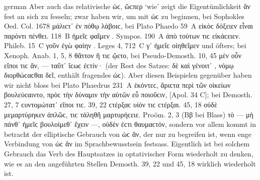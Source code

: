 \begin{otherlanguage*}{german}
Aber auch das relativische ὡϲ, ὥϲπερ ‘wie’ zeigt die Eigentümlichkeit ἄν fest an sich zu fesseln; zwar haben wir, um mit ὡϲ zu beginnen, bei Sophokles Oed. Col. 1678  μάλιϲτ᾽  ἐν πόθῳ λάβοιϲ, bei Plato Phaedo 59~A  εἰκὸϲ δόξειεν  εἶναι παρόντι πένθει. 118~Β  ἡμεῖϲ φαῖμεν . Sympos. 190~Α  ἀπὸ τούτων  τιϲ εἰκάϲειεν. Phileb. 15~C  γοῦν ἐγὼ φαίην . Leges 4, 712~C  γ᾽ ἡμεῖϲ  οἰηθεῖμεν und öfters; bei Xenoph. Anab. 1, 5, 8 θᾶττον ἢ  τιϲ  ᾤετο, bei Pseudo-Demosth. 10, 45  μὲν οὖν εἴποι τιϲ {ἄν}, — ταῦτ᾽ ἴϲωϲ ἐϲτίν· (der Rest des Satzes:  δὲ καὶ γένοιτ᾽ , νόμῳ διορθώϲαϲθαι δεῖ, enthält fragendes ὡϲ). Aber diesen Beispielen gegenüber haben wir nicht bloss bei Plato Phaedrus 231~A ἑκόντεϲ,  ἄριϲτα περὶ τῶν οἰκείων βουλεύϲαιντο, πρὸϲ τὴν δύναμιν τὴν αὑτῶν εὖ ποιοῦϲιν, [Apol. 34 C]; bei Demosth. 27, 7  ϲυντομώτατ᾽ εἴποι τιϲ. 39, 22 ϲτέρξαϲ  υἱόν τιϲ ϲτέρξαι. 45, 18 οὐδὲ μεμαρτύρηκεν ἁπλῶϲ,  τιϲ τἀληθῆ μαρτυρήϲειε. Proöm. 2, 3 (Ββ bei Blass) τὸ — μὴ πάνθ᾽  ἡμεῖϲ βουλοίμεθ᾽ ἔχειν —, οὐδέν ἐϲτι θαυμαϲτόν, sondern vor allem kommt in betracht der elliptische Gebrauch von ὡϲ ἄν, der nur zu begreifen ist, wenn enge Verbindung von ὡϲ ἄν im Sprachbewusstsein festsass. Eigentlich ist bei solchem Gebrauch das Verb des Hauptsatzes in optativischer Form wiederholt zu denken, wie es an den angeführten Stellen Demosth. 39, 22 und 45, 18 wirklich wiederholt ist.


\end{otherlanguage*}
